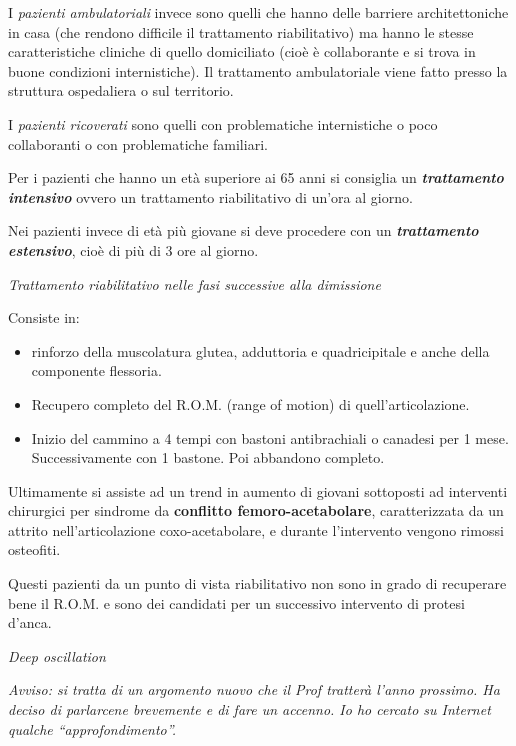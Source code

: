 \documentclass[]{article}
\begin{document}
I \emph{pazienti ambulatoriali} invece sono quelli che hanno delle
barriere architettoniche in casa (che rendono difficile il trattamento
riabilitativo) ma hanno le stesse caratteristiche cliniche di quello
domiciliato (cioè è collaborante e si trova in buone condizioni
internistiche). Il trattamento ambulatoriale viene fatto presso la
struttura ospedaliera o sul territorio.

I \emph{pazienti ricoverati} sono quelli con problematiche internistiche
o poco collaboranti o con problematiche familiari.

Per i pazienti che hanno un età superiore ai 65 anni si consiglia un
\emph{\textbf{trattamento intensivo}} ovvero un trattamento
riabilitativo di un'ora al giorno.

Nei pazienti invece di età più giovane si deve procedere con un
\emph{\textbf{trattamento estensivo}}, cioè di più di 3 ore al giorno.

\emph{Trattamento riabilitativo nelle fasi successive alla dimissione}

Consiste in:

\begin{itemize}
\item
  rinforzo della muscolatura glutea, adduttoria e quadricipitale e anche
  della componente flessoria.
\end{itemize}

\begin{itemize}
\item
  Recupero completo del R.O.M. (range of motion) di quell'articolazione.
\item
  Inizio del cammino a 4 tempi con bastoni antibrachiali o canadesi per
  1 mese. Successivamente con 1 bastone. Poi abbandono completo.
\end{itemize}

Ultimamente si assiste ad un trend in aumento di giovani sottoposti ad
interventi chirurgici per sindrome da \textbf{conflitto
femoro-acetabolare}, caratterizzata da un attrito nell'articolazione
coxo-acetabolare, e durante l'intervento vengono rimossi osteofiti.

Questi pazienti da un punto di vista riabilitativo non sono in grado di
recuperare bene il R.O.M. e sono dei candidati per un successivo
intervento di protesi d'anca.

\emph{Deep oscillation}

\emph{Avviso: si tratta di un argomento nuovo che il Prof tratterà
l'anno prossimo. Ha deciso di parlarcene brevemente e di fare un
accenno. Io ho cercato su Internet qualche ``approfondimento''.}
\end{document}

